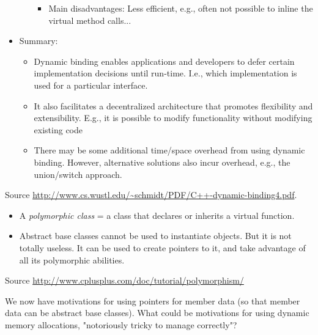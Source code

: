 \documentclass[twoside,english]{uiofysmaster}
\begin{document}
\begin{itemize}
\begin{itemize}
\begin{itemize}
\begin{enumerate}
			\end{enumerate}
			\item Main disadvantages: Less efficient, e.g., often not possible to inline the virtual method calls...
		\end{itemize}
	\end{itemize}
	\item Summary:
	\begin{itemize}
		\item Dynamic binding enables applications and developers to defer certain implementation decisions until run-time. I.e., which implementation is used for a particular interface.
		\item It also facilitates a decentralized architecture that promotes flexibility and extensibility. E.g., it is possible to modify functionality without modifying existing code
		\item There may be some additional time/space overhead from using dynamic binding. However, alternative solutions also incur overhead, e.g., the union/switch approach.
	\end{itemize}
\end{itemize}
Source \url{http://www.cs.wustl.edu/~schmidt/PDF/C++-dynamic-binding4.pdf}.

\begin{itemize}
	\item A \textit{polymorphic class} = a class that declares or inherits a virtual function.
	\item Abstract base classes cannot be used to instantiate objects. But it is not totally useless. It can be used to create pointers to it, and take advantage of all its polymorphic abilities.
\end{itemize}
Source \url{http://www.cplusplus.com/doc/tutorial/polymorphism/}

We now have motivations for using pointers for member data (so that member data can be abstract base classes). What could be motivations for using dynamic memory allocations, "notoriously tricky to manage correctly"? 
\end{document}
